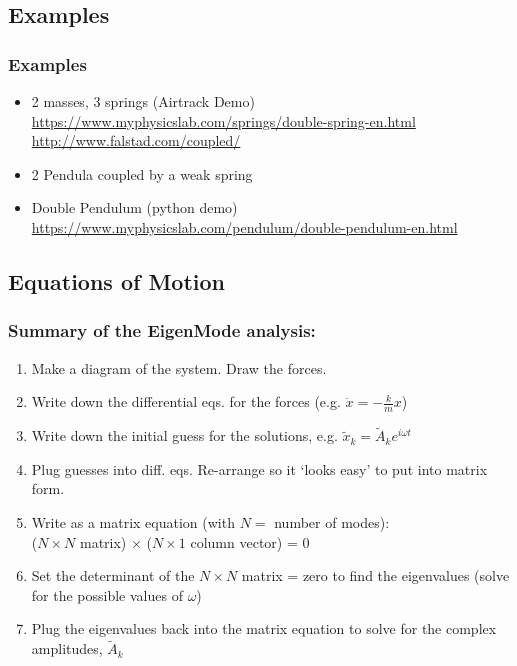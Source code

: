 \documentclass[pdf,handout, hideothersubsections]{beamer}
\begin{document}
\subsection{Examples}
\begin{frame}
\frametitle{Examples}

\begin{itemize}
\item 2 masses, 3 springs (Airtrack Demo) \\
\url{https://www.myphysicslab.com/springs/double-spring-en.html} \\
\url{http://www.falstad.com/coupled/}
\item 2 Pendula coupled by a weak spring
\item Double Pendulum (python demo) \\
\url{https://www.myphysicslab.com/pendulum/double-pendulum-en.html}


\end{itemize}


\end{frame}



\subsection{Equations of Motion}


\begin{frame}
\frametitle{Summary of the EigenMode analysis:}
\begin{enumerate}
\item Make a diagram of the system. Draw the forces.
\pause
\item Write down the differential eqs. for the forces (e.g. 
$\ddot{x} = -\frac{k}{m} x$)
\pause
\item Write down the initial guess for the solutions,
  e.g. $\tilde{x}_k = \tilde{A}_k e^{i \omega t}$
\pause
\item Plug guesses into diff. eqs. Re-arrange so it `looks easy' to put
  into matrix form.
\pause
\item Write as a matrix equation (with $N = $ number of modes): \\
($N \times N$ matrix) $\times$ ($N \times 1$ column vector) = 0
\pause
\item Set the determinant of the $N \times N$ matrix = zero to find
  the eigenvalues (solve for the possible values of $\omega$)
\pause
\item Plug the eigenvalues back into the matrix equation to solve for
  the complex amplitudes, $\tilde{A}_k$
\end{enumerate}
\end{frame}
\end{document}
